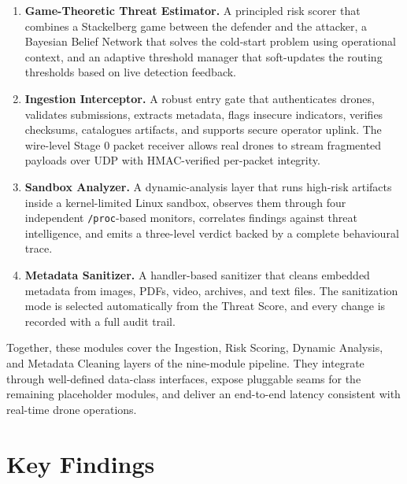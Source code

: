 \documentclass[12pt, a4paper]{report}
\begin{document}
\begin{enumerate}
    \item \textbf{Game-Theoretic Threat Estimator.} A principled risk
          scorer that combines a Stackelberg game between the defender
          and the attacker, a Bayesian Belief Network that solves the
          cold-start problem using operational context, and an
          adaptive threshold manager that soft-updates the routing
          thresholds based on live detection feedback.
    \item \textbf{Ingestion Interceptor.} A robust entry gate that
          authenticates drones, validates submissions, extracts
          metadata, flags insecure indicators, verifies checksums,
          catalogues artifacts, and supports secure operator uplink.
          The wire-level Stage 0 packet receiver allows real drones to
          stream fragmented payloads over UDP with HMAC-verified
          per-packet integrity.
    \item \textbf{Sandbox Analyzer.} A dynamic-analysis layer that
          runs high-risk artifacts inside a kernel-limited Linux
          sandbox, observes them through four independent
          \texttt{/proc}-based monitors, correlates findings against
          threat intelligence, and emits a three-level verdict backed
          by a complete behavioural trace.
    \item \textbf{Metadata Sanitizer.} A handler-based sanitizer that
          cleans embedded metadata from images, PDFs, video, archives,
          and text files. The sanitization mode is selected
          automatically from the Threat Score, and every change is
          recorded with a full audit trail.
\end{enumerate}

Together, these modules cover the Ingestion, Risk Scoring, Dynamic
Analysis, and Metadata Cleaning layers of the nine-module pipeline.
They integrate through well-defined data-class interfaces, expose
pluggable seams for the remaining placeholder modules, and deliver an
end-to-end latency consistent with real-time drone operations.

\section{Key Findings}
\end{document}
